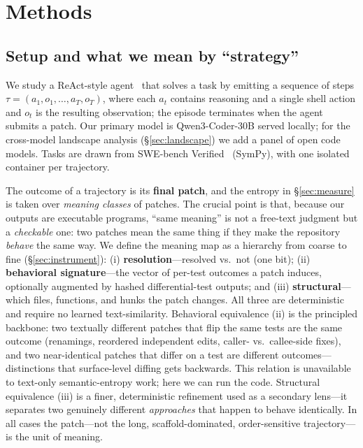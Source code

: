 \documentclass[11pt]{article}
\begin{document}
\section{Methods}

\subsection{Setup and what we mean by ``strategy''}
We study a ReAct-style agent~\citep{yao2023react} that solves a task by emitting a
sequence of steps $\tau=(a_1,o_1,\dots,a_T,o_T)$, where each $a_t$ contains
reasoning and a single shell action and $o_t$ is the resulting observation; the
episode terminates when the agent submits a patch. Our primary model is
Qwen3-Coder-30B served locally; for the cross-model landscape analysis
(\S\ref{sec:landscape}) we add a panel of open code models. Tasks are drawn from
SWE-bench Verified~\citep{jimenez2024swebench} (SymPy), with one isolated container
per trajectory.

The outcome of a trajectory is its \textbf{final patch}, and the entropy in
\S\ref{sec:measure} is taken over \emph{meaning classes} of patches. The crucial
point is that, because our outputs are executable programs, ``same meaning'' is
not a free-text judgment but a \emph{checkable} one: two patches mean the same
thing if they make the repository \emph{behave} the same way. We define the
meaning map as a hierarchy from coarse to fine (\S\ref{sec:instrument}): (i)
\textbf{resolution}---resolved vs.\ not (one bit); (ii) \textbf{behavioral
signature}---the vector of per-test outcomes a patch induces, optionally augmented
by hashed differential-test outputs; and (iii) \textbf{structural}---which
files, functions, and hunks the patch changes. All three are deterministic and
require no learned text-similarity. Behavioral equivalence (ii) is the
principled backbone: two textually different patches that flip the same tests are
the same outcome (renamings, reordered independent edits, caller- vs.\ callee-side
fixes), and two near-identical patches that differ on a test are different
outcomes---distinctions that surface-level diffing gets backwards. This relation
is unavailable to text-only semantic-entropy work; here we can run the code.
Structural equivalence (iii) is a finer, deterministic refinement used as a
secondary lens---it separates two genuinely different \emph{approaches} that
happen to behave identically. In all cases the patch---not the long,
scaffold-dominated, order-sensitive trajectory---is the unit of meaning.
\end{document}
